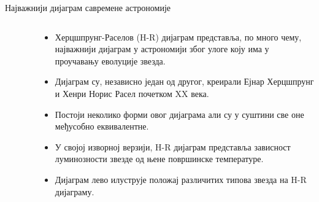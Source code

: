 \documentclass[aspectratio=169, xcolor=table, 10pt]{beamer}
\begin{document}
\begin{frame}{Најважнији дијаграм савремене астрономије}
  \begin{columns}[T]
    \begin{column}{0.45\textwidth}
      \begin{figure}
        \centering
        \vspace{-1em}
      \end{figure}
    \end{column}
    \begin{column}{0.55\textwidth}
      \begin{itemize}
        \item Херцшпрунг-Раселов (H-R) дијаграм представља, по много чему, најважнији дијаграм у астрономији због улоге коју има у проучавању еволуције звезда.
        \item Дијаграм су, независно један од другог, креирали Ејнар Херцшпрунг и Хенри Норис Расел почетком XX века\cite{mathias}.
        \item Постоји неколико форми овог дијаграма али су у суштини све оне међусобно еквивалентне.
        \item У својој изворној верзији, H-R дијаграм представља зависност луминозности звезде од њене површинске температуре.
        \item Дијаграм лево илуструје положај различитих типова звезда на H-R дијаграму.
      \end{itemize}
    \end{column}
  \end{columns}
\end{frame}
\end{document}
